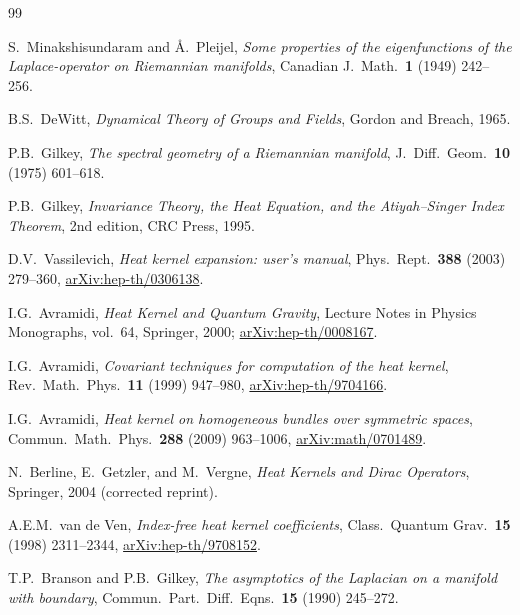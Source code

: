 \documentclass[11pt,a4paper]{article}
\begin{document}
\begin{thebibliography}{99}

S.~Minakshisundaram and {\AA}.~Pleijel,
\textit{Some properties of the eigenfunctions of the Laplace-operator
on Riemannian manifolds},
Canadian J.\ Math.\ \textbf{1} (1949) 242--256.

B.S.~DeWitt,
\textit{Dynamical Theory of Groups and Fields},
Gordon and Breach, 1965.

P.B.~Gilkey,
\textit{The spectral geometry of a Riemannian manifold},
J.\ Diff.\ Geom.\ \textbf{10} (1975) 601--618.

P.B.~Gilkey,
\textit{Invariance Theory, the Heat Equation, and the Atiyah--Singer
Index Theorem}, 2nd edition, CRC Press, 1995.

D.V.~Vassilevich,
\textit{Heat kernel expansion: user's manual},
Phys.\ Rept.\ \textbf{388} (2003) 279--360,
\href{https://arxiv.org/abs/hep-th/0306138}{arXiv:hep-th/0306138}.

I.G.~Avramidi,
\textit{Heat Kernel and Quantum Gravity},
Lecture Notes in Physics Monographs, vol.~64, Springer, 2000;
\href{https://arxiv.org/abs/hep-th/0008167}{arXiv:hep-th/0008167}.

I.G.~Avramidi,
\textit{Covariant techniques for computation of the heat kernel},
Rev.\ Math.\ Phys.\ \textbf{11} (1999) 947--980,
\href{https://arxiv.org/abs/hep-th/9704166}{arXiv:hep-th/9704166}.

I.G.~Avramidi,
\textit{Heat kernel on homogeneous bundles over symmetric spaces},
Commun.\ Math.\ Phys.\ \textbf{288} (2009) 963--1006,
\href{https://arxiv.org/abs/math/0701489}{arXiv:math/0701489}.

N.~Berline, E.~Getzler, and M.~Vergne,
\textit{Heat Kernels and Dirac Operators},
Springer, 2004 (corrected reprint).

A.E.M.~van de Ven,
\textit{Index-free heat kernel coefficients},
Class.\ Quantum Grav.\ \textbf{15} (1998) 2311--2344,
\href{https://arxiv.org/abs/hep-th/9708152}{arXiv:hep-th/9708152}.

T.P.~Branson and P.B.~Gilkey,
\textit{The asymptotics of the Laplacian on a manifold with boundary},
Commun.\ Part.\ Diff.\ Eqns.\ \textbf{15} (1990) 245--272.


\end{thebibliography}
\end{document}
